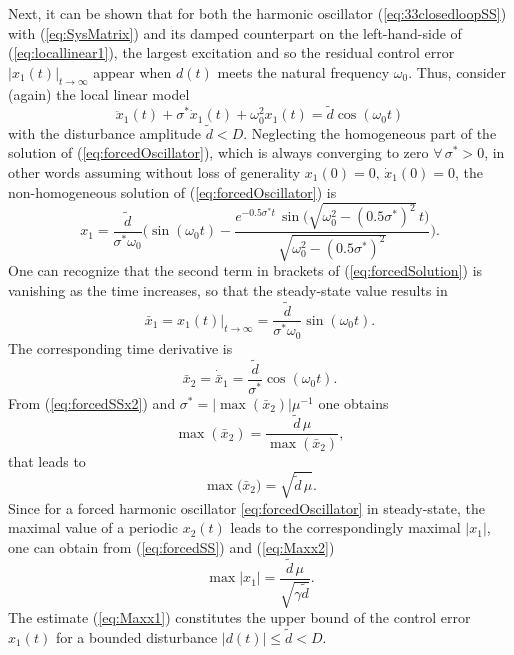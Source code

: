 \documentclass[letterpaper, 10 pt, conference]{ieeeconf}  %
\begin{document}
Next, it can be shown that for both the harmonic oscillator (\ref{eq:33closedloopSS})
with (\ref{eq:SysMatrix}) and its damped counterpart on the 
left-hand-side of (\ref{eq:locallinear1}), the largest excitation and so the residual control
error $\bigl|x_{1}(t)\bigr|_{t\rightarrow\infty}$ appear when $d(t)$
meets the natural frequency $\omega_{0}$. Thus, consider (again) the local
linear model 
\begin{equation}
\ddot{x}_{1}(t)+\sigma^{\ast}\dot{x}_{1}(t)+\omega_{0}^{2}x_{1}(t)=\tilde{d}\cos(\omega_{0}t)\label{eq:forcedOscillator}
\end{equation}
with the disturbance amplitude $\tilde{d}<D$. Neglecting the homogeneous
part of the solution of (\ref{eq:forcedOscillator}), which is always
converging to zero $\forall\,\sigma^{\ast}>0$, in other words assuming without
loss of generality $x_{1}(0)=0,\,\dot{x}_{1}(0)=0$, the non-homogeneous
solution of (\ref{eq:forcedOscillator}) is 
\begin{equation}
x_{1}=\frac{\tilde{d}}{\sigma^{\ast}\omega_{0}}\bigg(\sin(\omega_{0}t)-\dfrac{e^{-0.5\sigma^{\ast} t}\,\sin\bigl(\sqrt{\omega_{0}^{2}-(0.5\sigma^{\ast})^{2}}\,t\bigr)}{\sqrt{\omega_{0}^{2}-(0.5\sigma^{\ast})^{2}}}\biggr).\label{eq:forcedSolution}
\end{equation}
One can recognize that the second term in brackets of (\ref{eq:forcedSolution})
is vanishing as the time increases, so that the steady-state value
results in 
\begin{equation}
\bar{x}_{1}=x_{1}(t)\bigr|_{t\rightarrow\infty}=\frac{\tilde{d}}{\sigma^{\ast}\omega_{0}}\sin(\omega_{0}t).\label{eq:forcedSS}
\end{equation}
The corresponding time derivative is 
\begin{equation}
\bar{x}_{2}=\dot{\bar{x}}_{1}=\frac{\tilde{d}}{\sigma^{\ast}}\cos(\omega_{0}t).\label{eq:forcedSSx2}
\end{equation}
From (\ref{eq:forcedSSx2}) and $\sigma^{\ast}=\bigl|\max(\bar{x}_{2})\bigr|\mu^{-1}$ one obtains 
\[
\max(\bar{x}_{2})=\frac{\tilde{d}\,\mu}{\max(\bar{x}_{2})},
\]
that leads to 
\begin{equation}
\max\bigl(\bar{x}_{2}\bigr)=\sqrt{\tilde{d}\,\mu}.\label{eq:Maxx2}
\end{equation}
Since for a forced harmonic oscillator \eqref{eq:forcedOscillator} in steady-state, the maximal
value of a periodic $x_2(t)$ leads to the correspondingly maximal $|x_{1}|$,
one can obtain from (\ref{eq:forcedSS}) and (\ref{eq:Maxx2}) 
\begin{equation}
\max|x_{1}|=\frac{\tilde{d}\,\mu}{\sqrt{\gamma\tilde{d}}}.\label{eq:Maxx1}
\end{equation}
The estimate (\ref{eq:Maxx1}) constitutes the upper bound of the
control error $x_{1}(t)$ for a bounded disturbance $|d(t)|\leq\tilde{d}<D$.
\end{document}

